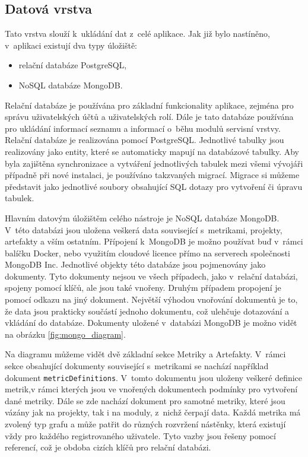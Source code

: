 \documentclass[czech,master]{diploma}
\begin{document}
\subsection{Datová vrstva}
Tato vrstva slouží k~ukládání dat z~celé aplikace. Jak již bylo nastíněno, v~aplikaci existují dva typy úložiště:

\begin{itemize}
\item relační databáze PostgreSQL,
\item NoSQL databáze MongoDB.
\end{itemize}

Relační databáze je používána pro základní funkcionality aplikace, zejména pro správu uživatelských účtů a uživatelských rolí. Dále je tato databáze používána pro ukládání informací seznamu a informací o~běhu modulů servisní vrstvy. Relační databáze je realizována pomocí PostgreSQL. Jednotlivé tabulky jsou realizovány jako entity, které se automaticky mapují na databázové tabulky. Aby byla zajištěna synchronizace a vytváření jednotlivých tabulek mezi všemi vývojáři případně při nové instalaci, je používáno takzvaných migrací. Migrace si můžeme představit jako jednotlivé soubory obsahující SQL dotazy pro vytvoření či úpravu tabulek.

Hlavním datovým úložištěm celého nástroje je NoSQL databáze MongoDB. V~této databázi jsou uložena veškerá data související s~metrikami, projekty, artefakty a vším ostatním. Přípojení k~MongoDB je možno používat buď v~rámci balíčku Docker, nebo využitím cloudové licence přímo na serverech společnosti MongoDB Inc. Jednotlivé objekty této databáze jsou pojmenovány jako dokumenty. Tyto dokumenty nejsou ve všech případech, jako v~relační databázi, spojeny pomocí klíčů, ale jsou také vnořeny. Druhým případem propojení je pomocí odkazu na jiný dokument. Největší výhodou vnořování dokumentů je to, že data jsou prakticky součástí jednoho dokumentu, což ulehčuje dotazování a vkládání do databáze. Dokumenty uložené v~databázi MongoDB je možno vidět na obrázku \ref{fig:mongo_diagram}.

Na diagramu můžeme vidět dvě základní sekce Metriky a Artefakty. V~rámci sekce obsahující dokumenty související s~metrikami se nachází například dokument \texttt{metricDefinitions}. V~tomto dokumentu jsou uloženy veškeré definice metrik,v rámci kterých jsou ve vnořených dokumentech podmínky pro vytvoření dané metriky. Dále se zde nachází dokument pro samotné metriky, které jsou vázány jak na projekty, tak i na moduly, z~nichž čerpají data. Každá metrika má zvolený typ grafu a může patřit do různých rozvržení nástěnky, která existují vždy pro každého registrovaného uživatele. Tyto vazby jsou řešeny pomocí  referencí, což je obdoba cizích klíčů pro relační databázi.
\end{document}
